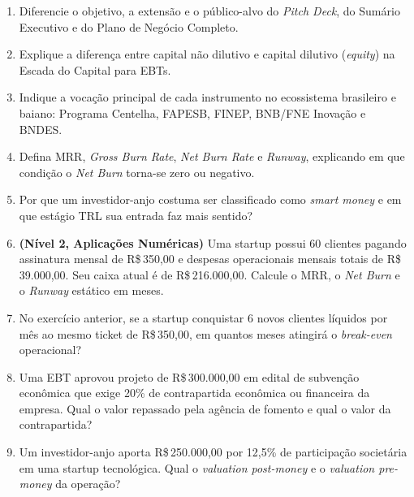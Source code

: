 \begin{enumerate}[leftmargin=1.5em, itemsep=6pt]
  \item Diferencie o objetivo, a extensão e o público-alvo do \textit{Pitch Deck}, do Sumário Executivo e do Plano de Negócio Completo.
  \espacoResolucao[1.8cm]

  \item Explique a diferença entre capital não dilutivo e capital dilutivo (\textit{equity}) na Escada do Capital para EBTs.
  \espacoResolucao[1.8cm]

  \item Indique a vocação principal de cada instrumento no ecossistema brasileiro e baiano: Programa Centelha, FAPESB, FINEP, BNB/FNE Inovação e BNDES.
  \espacoResolucao[1.8cm]

  \item Defina MRR, \textit{Gross Burn Rate}, \textit{Net Burn Rate} e \textit{Runway}, explicando em que condição o \textit{Net Burn} torna-se zero ou negativo.
  \espacoResolucao[1.8cm]

  \item Por que um investidor-anjo costuma ser classificado como \textit{smart money} e em que estágio TRL sua entrada faz mais sentido?
  \espacoResolucao[1.8cm]

  \item \textbf{(Nível 2, Aplicações Numéricas)} Uma startup possui 60 clientes pagando assinatura mensal de R\$\,350,00 e despesas operacionais mensais totais de R\$\,39.000,00. Seu caixa atual é de R\$\,216.000,00. Calcule o MRR, o \textit{Net Burn} e o \textit{Runway} estático em meses.
  \espacoResolucao[2.2cm]

  \item No exercício anterior, se a startup conquistar 6 novos clientes líquidos por mês ao mesmo ticket de R\$\,350,00, em quantos meses atingirá o \textit{break-even} operacional?
  \espacoResolucao[2.2cm]

  \item Uma EBT aprovou projeto de R\$\,300.000,00 em edital de subvenção econômica que exige 20\% de contrapartida econômica ou financeira da empresa. Qual o valor repassado pela agência de fomento e qual o valor da contrapartida?
  \espacoResolucao[2.1cm]

  \item Um investidor-anjo aporta R\$\,250.000,00 por 12{,}5\% de participação societária em uma startup tecnológica. Qual o \textit{valuation post-money} e o \textit{valuation pre-money} da operação?
  \espacoResolucao[2.2cm]


\end{enumerate}
